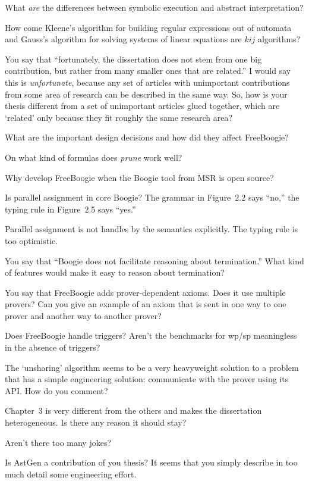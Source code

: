 \Q What {\it are\/} the differences between symbolic execution and abstract
interpretation?

\Q How come Kleene's algorithm for building regular expressions out of
automata and Gauss's algorithm for solving systems of linear equations are
$kij$ algorithms?

\Q You say that ``fortunately, the dissertation does not stem from one big
contribution, but rather from many smaller ones that are related.'' I would
say this is {\it unfortunate}, because any set of articles with unimportant
contributions from some area of research can be described in the same way.
So, how is your thesis different from a set of unimportant articles glued
together, which are `related' only because they fit roughly the same
research area?

\Q What are the important design decisions and how did they affect
FreeBoogie?

\Q On what kind of formulas does {\it prune\/} work well?

\Q Why develop FreeBoogie when the Boogie tool from MSR is open source?

\Q Is parallel assignment in core Boogie? The grammar in Figure~2.2 says
``no,'' the typing rule in Figure~2.5 says ``yes.''

\A Parallel assignment is not handles by the semantics explicitly. The
typing rule is too optimistic.

\Q You say that ``Boogie does not facilitate reasoning about termination.''
What kind of features would make it easy to reason about termination?

\Q You say that FreeBoogie adds prover-dependent axioms. Does it use
multiple provers? Can you give an example of an axiom that is sent in one
way to one prover and another way to another prover?

\Q Does FreeBoogie handle triggers? Aren't the benchmarks for wp/sp
meaningless in the absence of triggers?

\Q The `unsharing' algorithm seems to be a very heavyweight solution to a
problem that has a simple engineering solution: communicate with the prover
using its API. How do you comment?

\Q Chapter~3 is very different from the others and makes the dissertation
heterogeneous. Is there any reason it should stay?

\Q Aren't there too many jokes?

\Q Is AstGen a contribution of you thesis? It seems that you simply
describe in too much detail some engineering effort.

